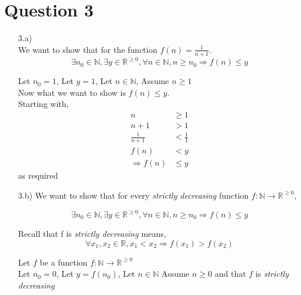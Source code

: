 \documentclass[20pt]{article}
\begin{document}
\newpage

\section*{Question 3}
\begin{enumerate}
    \item [3.a)]\\
    We want to show that for the function $f(n) = \frac{1}{n+1}$.
    \[\exists n_0 \in \mathbb{N}, \exists y \in \mathbb{R}^{\geq0}, \forall n \in \mathbb{N}, n \geq n_0 \Rightarrow f(n) \leq y\]
    
    Let $n_0 = 1$, Let $y = 1$, Let $n \in \mathbb{N}$, Assume $n \geq 1$ \\
    
    Now what we want to show is $f(n) \leq y$. \\
    Starting with, 
    \begin{align*}
    n &\geq 1 \\
    n + 1 &> 1 \\
    \frac{1}{n+1} &< \frac{1}{1} \tag{By inequality rules}\\
    f(n) &< y \\
    \Rightarrow f(n) &\leq y
    \end{align*}
    as required \hfill \Box
    \\
    
    \item [3.b)]
    We want to show that for every \emph{strictly decreasing} function $f: \mathbb{N} \to \mathbb{R}^{\geq0}$,
    
    \[\exists n_0 \in \mathbb{N}, \exists y \in \mathbb{R}^{\geq0}, \forall n \in \mathbb{N}, n \geq n_0 \Rightarrow f(n) \leq y\]
    
    Recall that f is \emph{strictly decreasing} means, 
    \[ \forall x_1, x_2 \in \mathbb{R}, x_1 < x_2 \Rightarrow f(x_1) > f(x_2)\]
    
    Let $f$ be a function $f: \mathbb{N} \to \mathbb{R}^{\geq0}$\\
    Let $n_0 = 0$, Let $y = f(n_0)$, 
    Let $n \in \mathbb{N}$ Assume $n \geq 0$ and that $f$ is \emph{strictly decreasing}\\
     

\end{enumerate}
\end{document}
